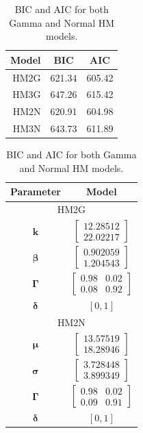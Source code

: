 \documentclass[wrr]{AGUTeX}
\begin{document}
\begin{table}
\centering
\caption{BIC and AIC for both Gamma and Normal HM models. }\label{tbl:bic}
\begin{tabular}{rcc}
\toprule
Model & BIC & AIC\\
\midrule
HM2G & 621.34 & 605.42 \\
HM3G & 647.26 & 615.42 \\
HM2N & 620.91 & 604.98 \\
HM3N & 643.73 & 611.89 \\
\bottomrule
\end{tabular}
\begin{tablenotes}

\end{tablenotes}
\end{table}


\begin{table}
\centering
\caption{BIC and AIC for both Gamma and Normal HM models. }\label{tbl:pars}
\begin{tabular}{cc}
\toprule
Parameter & Model  \\
\midrule
\multicolumn{2}{c}{HM2G}\\
\midrule
$\mathbf{k}$ & $\left[\begin{array}{c} 12.28512\\ 22.02217 \end{array}\right]$ \\ 
$\boldsymbol\beta$  & $\left[\begin{array}{c} 0.902059\\ 1.204543 \end{array}\right]$ \\ 
$\boldsymbol\Gamma$ & $\left[\begin{array}{cc} 0.98 & 0.02 \\ 0.08 & 0.92 \end{array}\right]$\\ 
$\boldsymbol\delta$ & $[0, 1]$ \\
\midrule
\multicolumn{2}{c}{HM2N}\\
\midrule
$\boldsymbol\mu$    & $\left[\begin{array}{c} 13.57519\\ 18.28946 \end{array}\right]$\\
$\boldsymbol\sigma$ & $\left[\begin{array}{c} 3.728448\\ 3.899349 \end{array}\right]$\\
$\boldsymbol\Gamma$ & $\left[\begin{array}{cc} 0.98 & 0.02 \\ 0.09 & 0.91 \end{array}\right]$\\
$\boldsymbol\delta$ & $[0, 1]$ \\
\bottomrule
\end{tabular}
\begin{tablenotes}

\end{tablenotes}
\end{table}
\end{document}
